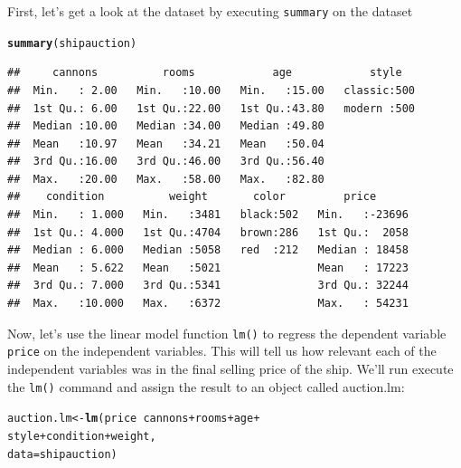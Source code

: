 \documentclass{tufte-book}\usepackage[]{graphicx}\usepackage[]{color}
\makeatletter
\newcommand{\hlopt}[1]{\textcolor[rgb]{0,0,0}{#1}}%
\newcommand{\hlstd}[1]{\textcolor[rgb]{0.345,0.345,0.345}{#1}}%
\newcommand{\hlkwb}[1]{\textcolor[rgb]{0.69,0.353,0.396}{#1}}%
\newcommand{\hlkwc}[1]{\textcolor[rgb]{0.333,0.667,0.333}{#1}}%
\newcommand{\hlkwd}[1]{\textcolor[rgb]{0.737,0.353,0.396}{\textbf{#1}}}%
\newenvironment{kframe}{%
 \def\at@end@of@kframe{}%
 \ifinner\ifhmode%
  \def\at@end@of@kframe{\end{minipage}}%
  \begin{minipage}{\columnwidth}%
 \fi\fi%
 \def\FrameCommand##1{\hskip\@totalleftmargin \hskip-\fboxsep
 \colorbox{shadecolor}{##1}\hskip-\fboxsep
     \hskip-\linewidth \hskip-\@totalleftmargin \hskip\columnwidth}%
 \MakeFramed {\advance\hsize-\width
   \@totalleftmargin\z@ \linewidth\hsize
   \@setminipage}}%
 {\par\unskip\endMakeFramed%
 \at@end@of@kframe}
\newenvironment{knitrout}{}{} %
\makeatother
\begin{document}
\begin{footnotesize}
First, let's get a look at the dataset by executing \texttt{summary} on the dataset

\begin{knitrout}
\color{fgcolor}\begin{kframe}
\begin{alltt}
\hlkwd{summary}\hlstd{(shipauction)}
\end{alltt}
\begin{verbatim}
##     cannons          rooms            age            style    
##  Min.   : 2.00   Min.   :10.00   Min.   :15.00   classic:500  
##  1st Qu.: 6.00   1st Qu.:22.00   1st Qu.:43.80   modern :500  
##  Median :10.00   Median :34.00   Median :49.80                
##  Mean   :10.97   Mean   :34.21   Mean   :50.04                
##  3rd Qu.:16.00   3rd Qu.:46.00   3rd Qu.:56.40                
##  Max.   :20.00   Max.   :58.00   Max.   :82.80                
##    condition          weight       color         price       
##  Min.   : 1.000   Min.   :3481   black:502   Min.   :-23696  
##  1st Qu.: 4.000   1st Qu.:4704   brown:286   1st Qu.:  2058  
##  Median : 6.000   Median :5058   red  :212   Median : 18458  
##  Mean   : 5.622   Mean   :5021               Mean   : 17223  
##  3rd Qu.: 7.000   3rd Qu.:5341               3rd Qu.: 32244  
##  Max.   :10.000   Max.   :6372               Max.   : 54231
\end{verbatim}
\end{kframe}
\end{knitrout}

Now, let's use the linear model function \texttt{lm()} to regress the dependent variable \texttt{price} on the independent variables. This will tell us how relevant each of the independent variables was in the final selling price of the ship. We'll run execute the \texttt{lm()} command and assign the result to an object called auction.lm:

\begin{knitrout}
\color{fgcolor}\begin{kframe}
\begin{alltt}
\hlstd{auction.lm} \hlkwb{<-} \hlkwd{lm}\hlstd{(price} \hlopt{~} \hlstd{cannons} \hlopt{+} \hlstd{rooms} \hlopt{+} \hlstd{age} \hlopt{+}
                   \hlstd{style} \hlopt{+} \hlstd{condition} \hlopt{+} \hlstd{weight,}
                 \hlkwc{data} \hlstd{= shipauction)}
\end{alltt}
\end{kframe}
\end{knitrout}


\end{footnotesize}
\end{document}
